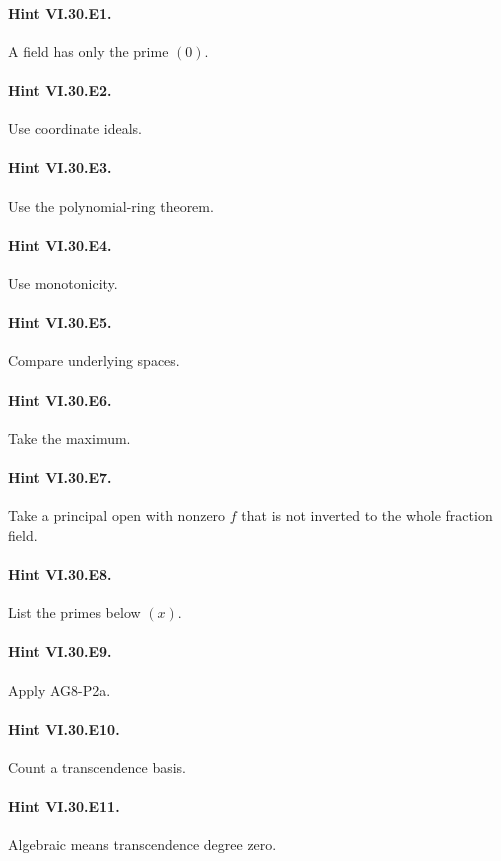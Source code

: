 \paragraph{Hint VI.30.E1.} A field has only the prime $(0)$.

\paragraph{Hint VI.30.E2.} Use coordinate ideals.

\paragraph{Hint VI.30.E3.} Use the polynomial-ring theorem.

\paragraph{Hint VI.30.E4.} Use monotonicity.

\paragraph{Hint VI.30.E5.} Compare underlying spaces.

\paragraph{Hint VI.30.E6.} Take the maximum.

\paragraph{Hint VI.30.E7.} Take a principal open with nonzero $f$ that is not inverted to the whole fraction field.

\paragraph{Hint VI.30.E8.} List the primes below $(x)$.

\paragraph{Hint VI.30.E9.} Apply AG8-P2a.

\paragraph{Hint VI.30.E10.} Count a transcendence basis.

\paragraph{Hint VI.30.E11.} Algebraic means transcendence degree zero.

